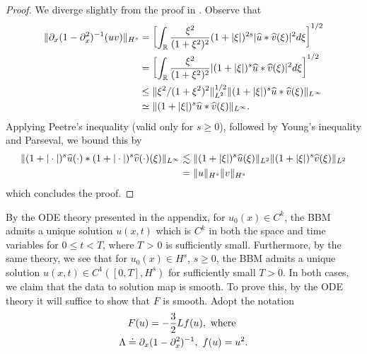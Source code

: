 \begin{proof}
    We diverge slightly from the proof in \cite{Bona_2009_Sharp-well-pose}. Observe that
        \begin{equation*}
        \begin{split}
        \| \partial_{x}(1 - \partial_{x}^{2})^{-1} (uv) \|_{H^{s}}
        & = \left [ \int_{\mathbb{R}} \frac{\xi^{2}}{(1 + \xi^{2})^{2}} (1 + |\xi|)^{2s} | \widehat{u} * \widehat{v}(\xi) |^{2} d \xi \right ]^{1/2}
        \\
        & = \left [ \int_{\mathbb{R}} \frac{\xi^{2}}{(1 + \xi^{2})^{2}} | (1 + |\xi|)^{s}\widehat{u} * \widehat{v}(\xi) |^{2} d \xi \right ]^{1/2}
        \\
        & \le \| \xi^{2}/(1 + \xi^{2})^{2} \|_{L^{2}}^{1/2} \| (1 + |\xi|)^{s} \widehat{u} * \widehat{v}(\xi) \|_{L^{\infty}}
        \\
        & \simeq \| (1 + |\xi|)^{s} \widehat{u} * \widehat{v}(\xi) \|_{L^{\infty}}.
            \end{split}
\end{equation*}
%
Applying Peetre's inequality (valid only for $s \ge 0$), followed by Young's inequality and Parseval, we bound this by
%
%
%
%
\begin{equation*}
\begin{split}
    \| (1 + |\cdot| )^{s}\widehat{u}(\cdot) * (1 + |\cdot| )^{s}\widehat{v}(\cdot)(\xi) \|_{L^{\infty}} 
    & \lesssim \| (1 + |\xi| )^{s}\widehat{u}(\xi)\|_{L^{2}} \| (1 + |\xi| )^{s}\widehat{v}(\xi) \|_{L^{2}}
    \\
    &  = \| u \|_{H^{s}} \| v \|_{H^{s}}
\end{split}
\end{equation*}
%
%
which concludes the proof.
%
\end{proof}
%
%
%
%
%
%
By the ODE theory presented in the appendix, for $u_{0}(x) \in C^{k}$, the BBM
admits a unique solution $u(x,t)$ which is $C^{k}$ in both the space and time
variables for $0 \le t < T$, where $T$ > $0$ is sufficiently small. Furthermore, by the same
theory, we see that for $u_{0}(x) \in H^{s}$, $s \ge 0$, the BBM admits a unique
solution $u(x,t) \in C^{1}([0, T], H^{s})$ for sufficiently small $T > 0$. In
both cases, we claim that the data to solution map is smooth. To prove this, by
the ODE theory it will suffice to show that $F$ is smooth. Adopt
the notation
\begin{gather*}
    F(u) = -\frac{3}{2}Lf(u), \ \text{where} \ 
    \\
    \Lambda \doteq \p_{x}(1 - \p_{x}^{2})^{-1}, \ f(u) = u^{2}.
\end{gather*}
